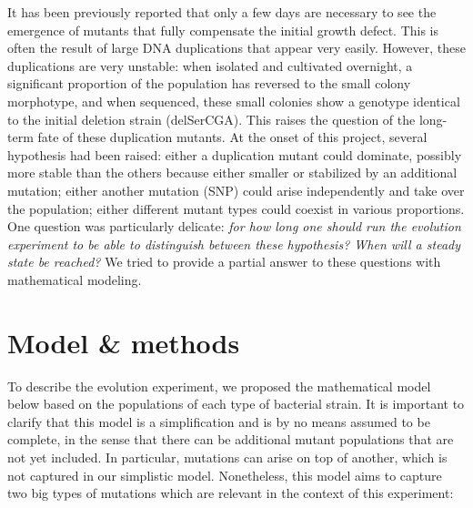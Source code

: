 \documentclass[10pt,a4paper]{scrartcl}
\begin{document}
It has been previously reported \cite{ayan_birth_2020} that only a few days are necessary to see the emergence of mutants that fully compensate the initial growth defect. This is often the result of large DNA duplications that appear very easily. However, these duplications are very unstable: when isolated and cultivated overnight, a significant proportion of the population has reversed to the small colony morphotype, and when sequenced, these small colonies show a genotype identical to the initial deletion strain  (delSerCGA).  This raises the question of the long-term fate of these duplication mutants.  At the onset of this project, several hypothesis had been raised: either a duplication mutant could dominate, possibly more stable than the others because either smaller or stabilized by an additional mutation; either another mutation (SNP) could arise independently and take over the population; either different mutant types could coexist in various proportions. One question was particularly delicate: \textit{for how long one should run the evolution experiment to be able to distinguish between these hypothesis? When will a steady state be reached?} We tried to provide a partial answer to these questions with mathematical modeling. 


\section{Model \& methods}

To describe the evolution experiment, we proposed the mathematical model below based on the populations of each type of bacterial strain. It is important to clarify that this model is a simplification and is by no means assumed to be complete, in the sense that there can be additional mutant populations that are not yet included.  In particular, mutations can arise on top of another, which is not captured in our simplistic model. Nonetheless,  this model aims to capture two big types of mutations which are relevant in the context of this experiment:
\end{document}
